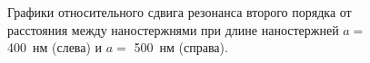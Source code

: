 
\begin{figure}
\caption{Графики относительного сдвига резонанса второго порядка от расстояния между наностержнями при длине наностержней $ a = $ 400~нм (слева) и $ a = $ 500~нм (справа).}
\label{img:shift}
\end{figure}

